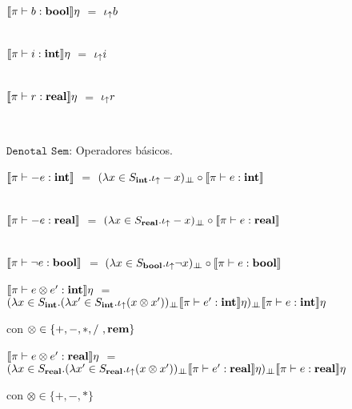 \begin{center}
$\llbracket \pi \vdash b : \textbf{bool} \rrbracket \eta$ $=$ $\iota_{\uparrow} b$\\

\

$\llbracket \pi \vdash i : \textbf{int} \rrbracket \eta$  $=$ $\iota_{\uparrow} i$\\

\

$\llbracket \pi \vdash r : \textbf{real} \rrbracket \eta$ $=$ $\iota_{\uparrow} r$
\end{center}
\

\noindent
$\texttt{Denotal Sem:}$ Operadores b\'asicos.\

\begin{center}

$\llbracket \pi \vdash -e : \textbf{int} \rrbracket$ $=$ $(\lambda x \in S_{\textbf{int}} . \iota_{\uparrow} -x)_{\bot \!\!\! \bot} \circ \llbracket \pi \vdash e : \textbf{int} \rrbracket$\\

\

$\llbracket \pi \vdash -e : \textbf{real} \rrbracket$ $=$ $(\lambda x \in S_{\textbf{real}} .\iota_{\uparrow} -x)_{\bot \!\!\! \bot} \circ \llbracket \pi \vdash e : \textbf{real} \rrbracket$\\

\

$\llbracket \pi \vdash \neg e : \textbf{bool} \rrbracket$ $=$ $(\lambda x \in S_{\textbf{bool}} . \iota_{\uparrow} \neg x)_{\bot \!\!\! \bot} \circ \llbracket \pi \vdash e : \textbf{bool} \rrbracket$

\end{center}

\noindent
$\llbracket \pi \vdash e \otimes e' : \textbf{int} \rrbracket\eta$ $=$ \\
				\indent \indent \indent $(\lambda x \in S_{\textbf{int}} . 
											(\lambda x' \in S_{\textbf{int}} . \iota_{\uparrow} (x \otimes x'))_{\bot \!\!\! \bot}
													\llbracket \pi \vdash e' : \textbf{int} \rrbracket\eta)_{\bot \!\!\! \bot}
														\llbracket \pi \vdash e : \textbf{int} \rrbracket\eta$

\begin{center}
con $\otimes \in \{+,-,*,/\ , \textbf{rem}\}$
\end{center}

\noindent
$\llbracket \pi \vdash e \otimes e' : \textbf{real} \rrbracket\eta$ $=$ \\
				\indent \indent \indent $(\lambda x \in S_{\textbf{real}} . 
											(\lambda x' \in S_{\textbf{real}} . \iota_{\uparrow} (x \otimes x'))_{\bot \!\!\! \bot}
													\llbracket \pi \vdash e' : \textbf{real} \rrbracket\eta)_{\bot \!\!\! \bot}
														\llbracket \pi \vdash e : \textbf{real} \rrbracket\eta$

\begin{center}
con $\otimes \in \{+,-,*\}$
\end{center}


